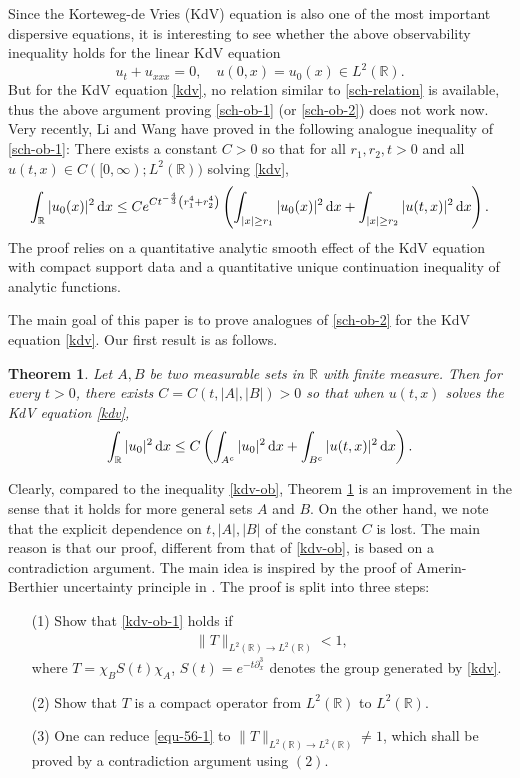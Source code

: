 \documentclass[preprint,12pt]{elsarticle}
\def\R {\mathbb{R}}
\def\d{{\,\rm d}}
\newtheorem{theorem}{Theorem}[section]
\begin{document}
Since the Korteweg-de Vries (KdV) equation is also one of the most important dispersive equations, it is interesting to see whether the above observability inequality holds for  the linear  KdV  equation
\begin{equation}\label{kdv}
u_t+u_{xxx}=0, \quad u(0,x)=u_0(x)\in L^2(\R).
\end{equation}
But for the KdV equation \eqref{kdv}, no relation similar to \eqref{sch-relation} is available, thus the above argument proving \eqref{sch-ob-1} (or \eqref{sch-ob-2}) does not work now. Very recently,  Li and  Wang have proved in \cite{LW} the following analogue inequality of \eqref{sch-ob-1}: There exists a constant $C>0$ so that for all $r_1,r_2,t>0$ and all $u(t,x)\in C([0,\infty);L^2(\R))$ solving \eqref{kdv},
\begin{equation}\label{kdv-ob}
    \int_{\R}|u_0(x)|^2\d x\le Ce^{Ct^{-\frac{4}{3}}\left(r_1^4+r_2^4\right)}\left(\int_{|x|\ge r_1}|u_0(x)|^2\d x+\int _{|x|\ge r_2}|u(t,x)|^2\d x\right).
\end{equation}
The proof relies on a quantitative analytic smooth effect of the KdV equation with compact support data and a quantitative unique continuation inequality of analytic functions.

The main goal of this paper is to prove analogues of \eqref{sch-ob-2} for the KdV equation \eqref{kdv}. Our first result is as follows.
\begin{theorem}\label{thm-1}
    Let $A,B$ be two  measurable sets in $\R$ with finite measure. Then for every $t>0$, there exists $C=C(t,|A|,|B|)>0$ so that when $u(t,x)$ solves the KdV equation \eqref{kdv},
    \begin{equation}\label{kdv-ob-1}
    \int_\R |u_0|^2\d x \leq C\left( \int_{A^c}|u_0|^2\d x + \int_{B^c}|u(t,x)|^2\d x \right).
    \end{equation}
    \end{theorem}

Clearly, compared to the inequality \eqref{kdv-ob}, Theorem \ref{thm-1} is an improvement in the sense that it holds for more general sets $A$ and $B$. On the other hand, we note that the explicit dependence on $t,|A|,|B|$ of the constant $C$ is lost. The main reason is that our proof, different from that of \eqref{kdv-ob}, is based on a contradiction argument. The main idea is inspired by the proof of Amerin-Berthier uncertainty principle in \cite{Amrein}. The proof is split into three steps:
\begin{itemize}
  \item [(1)] Show that \eqref{kdv-ob-1} holds if
\begin{align}\label{equ-56-1}
  \|T\|_{L^2(\R)\to L^2(\R)}<1,
\end{align}
  where $T=\chi_BS(t)\chi_A$, $S(t)=e^{-t\partial_x^3}$ denotes the group generated by \eqref{kdv}.
  \item [(2)] Show that $T$ is a compact operator from $L^2(\R)$ to $L^2(\R)$.
  \item [(3)] One can reduce \eqref{equ-56-1} to $\|T\|_{L^2(\R)\to L^2(\R)}\neq 1$, which shall be proved by a contradiction argument using $(2)$.
\end{itemize}
\end{document}
